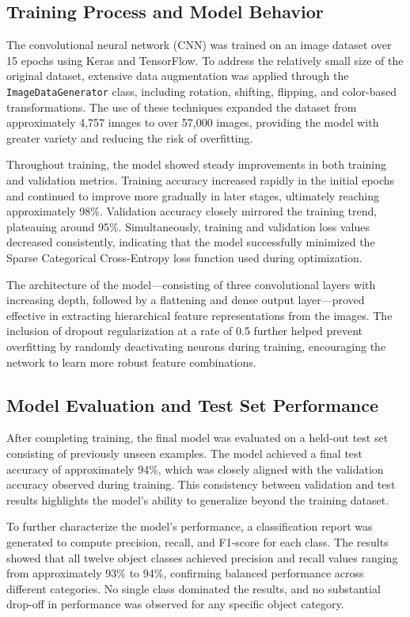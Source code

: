 \documentclass[10pt]{article}
\begin{document}
\subsection{Training Process and Model Behavior}

The convolutional neural network (CNN) was trained on an image dataset over 15 epochs using Keras and TensorFlow. To address the relatively small size of the original dataset, extensive data augmentation was applied through the \texttt{ImageDataGenerator} class, including rotation, shifting, flipping, and color-based transformations. The use of these techniques expanded the dataset from approximately 4,757 images to over 57,000 images, providing the model with greater variety and reducing the risk of overfitting.

Throughout training, the model showed steady improvements in both training and validation metrics. Training accuracy increased rapidly in the initial epochs and continued to improve more gradually in later stages, ultimately reaching approximately 98\%. Validation accuracy closely mirrored the training trend, plateauing around 95\%. Simultaneously, training and validation loss values decreased consistently, indicating that the model successfully minimized the Sparse Categorical Cross-Entropy loss function used during optimization.

The architecture of the model—consisting of three convolutional layers with increasing depth, followed by a flattening and dense output layer—proved effective in extracting hierarchical feature representations from the images. The inclusion of dropout regularization at a rate of 0.5 further helped prevent overfitting by randomly deactivating neurons during training, encouraging the network to learn more robust feature combinations.

\subsection{Model Evaluation and Test Set Performance}

After completing training, the final model was evaluated on a held-out test set consisting of previously unseen examples. The model achieved a final test accuracy of approximately 94\%, which was closely aligned with the validation accuracy observed during training. This consistency between validation and test results highlights the model's ability to generalize beyond the training dataset.

To further characterize the model’s performance, a classification report was generated to compute precision, recall, and F1-score for each class. The results showed that all twelve object classes achieved precision and recall values ranging from approximately 93\% to 94\%, confirming balanced performance across different categories. No single class dominated the results, and no substantial drop-off in performance was observed for any specific object category.
\end{document}
